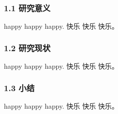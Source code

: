 
\subsubsection{1.1 研究意义}

happy happy happy\cite{John1997}.
快乐 快乐 快乐。

\subsubsection{1.2 研究现状}

happy happy happy.
快乐 快乐 快乐。

\subsubsection{1.3 小结}

happy happy happy.
快乐 快乐 快乐。

\clearpage